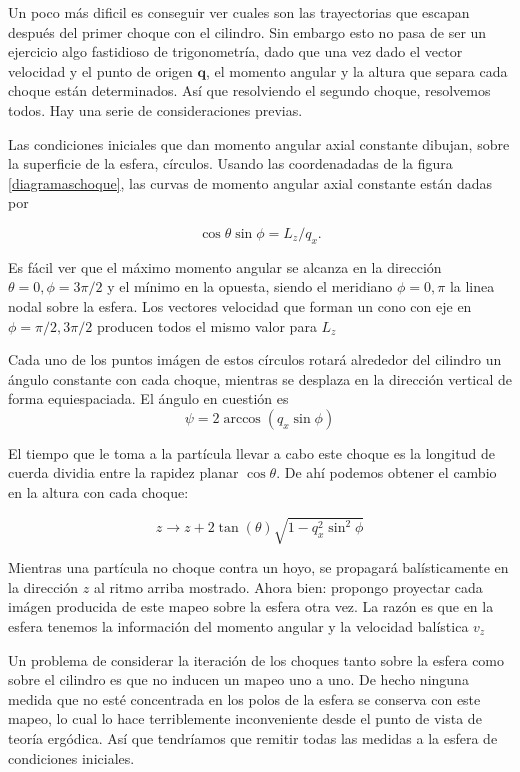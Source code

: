 \documentclass[letterpaper,12pt]{article}
\newcommand{\qfase}{\mathbf{q}}
\begin{document}
Un poco más dificil es conseguir ver cuales son las trayectorias que escapan
después del primer choque con el cilindro. Sin embargo esto no 
pasa de ser un ejercicio algo fastidioso de trigonometría, dado que una vez
dado el vector velocidad y el punto de origen $\qfase$, el momento angular
y la altura que separa cada choque están determinados. Así que resolviendo
el segundo choque, resolvemos todos. Hay una serie de consideraciones previas.

Las condiciones iniciales que dan momento angular axial constante
dibujan, sobre la superficie de la esfera, círculos. Usando las coordenadadas de
la figura \ref{diagramaschoque}, las curvas de momento angular axial
constante están dadas por 

\begin{equation}
 \cos \theta \sin \phi = L_z /q_x.
\end{equation}

Es fácil ver que el máximo momento angular se alcanza en la
dirección $\theta=0, \phi=3 \pi /2$ y el mínimo en la opuesta,
siendo el meridiano $\phi=0,\pi$ la linea nodal sobre la esfera. Los
vectores velocidad que forman un cono con eje en $\phi= \pi /2, 3\pi /2$ 
producen todos el mismo valor para $L_z$

Cada uno de los puntos imágen de estos círculos rotará alrededor
del cilindro un ángulo constante con cada choque, mientras se
desplaza en la dirección vertical de forma equiespaciada.
El ángulo en cuestión es 
\begin{equation}
\psi=2 \arccos (q_x \sin \phi)
\end{equation}

El tiempo que le toma a la partícula llevar a cabo este choque
es la longitud de cuerda dividia entre la rapidez planar  $\cos \theta$.
De ahí podemos obtener el cambio en la altura con cada choque:

\begin{equation}
  z\rightarrow z+2\tan(\theta)\sqrt{1-q_x^2\sin^2\phi}
\end{equation}

Mientras una partícula no choque contra un hoyo, se propagará
balísticamente en la dirección $z$ al ritmo arriba mostrado.
Ahora bien: propongo proyectar cada imágen producida de este mapeo
sobre la esfera otra vez. La razón es que en la esfera tenemos la 
información del momento angular y la velocidad balística $v_z$

Un problema de considerar la iteración de los choques tanto
sobre la esfera como sobre el cilindro es que no inducen un mapeo
uno a uno. De hecho ninguna medida que no esté concentrada
en los polos de la esfera se conserva con este mapeo, lo cual 
lo hace terriblemente inconveniente desde el punto de vista
de teoría ergódica. Así que tendríamos que remitir todas las
medidas a la esfera de condiciones iniciales. 
\end{document}

